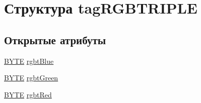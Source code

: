 \hypertarget{structtag_r_g_b_t_r_i_p_l_e}{\section{Структура tag\+R\+G\+B\+T\+R\+I\+P\+L\+E}
\label{structtag_r_g_b_t_r_i_p_l_e}
}
\subsection*{Открытые атрибуты}
\begin{DoxyCompactItemize}
\item 
\hyperlink{2dgraph_8cpp_a4ae1dab0fb4b072a66584546209e7d58}{B\+Y\+T\+E} \hyperlink{structtag_r_g_b_t_r_i_p_l_e_adbebf9e7802cdfffbdae31c08a71dab7}{rgbt\+Blue}
\item 
\hyperlink{2dgraph_8cpp_a4ae1dab0fb4b072a66584546209e7d58}{B\+Y\+T\+E} \hyperlink{structtag_r_g_b_t_r_i_p_l_e_a2e3e106422819352693de65189cc341f}{rgbt\+Green}
\item 
\hyperlink{2dgraph_8cpp_a4ae1dab0fb4b072a66584546209e7d58}{B\+Y\+T\+E} \hyperlink{structtag_r_g_b_t_r_i_p_l_e_ae61b0771fd3e1e267a3495dcfba5e21c}{rgbt\+Red}
\end{DoxyCompactItemize}


